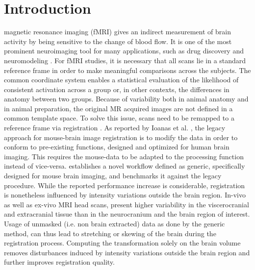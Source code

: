 \section{Introduction}
 magnetic resonance imaging (fMRI) gives an indirect measurement of brain activity by being sensitive to the change of blood flow.
It is one of the most prominent neuroimaging tool for many applications, such as drug discovery \cite{borsook_role_2006} and neuromodeling \cite{friston_dynamic_2003}.
For fMRI studies, it is necessary that all scans lie in a standard reference frame in order to make meaningful comparisons across the subjects.
The common coordinate system enables a statistical evaluation of the likelihood of consistent activation across a group or, in other contexts, the differences in anatomy between two groups.
Because of variability both in animal anatomy and in animal preparation, the original MR acquired images are not defined in a common template space.
To solve this issue, scans need to be remapped to a reference frame via registration \cite{maintz_overview_nodate, sotiras_deformable_2013}.
As reported by Ioanas et al. \cite{ioanas_optimized_2019}, the legacy approach for mouse-brain image registration is to modify the data in order to conform to pre-existing functions, designed and optimized for human brain imaging.
This requires the mouse-data to be adapted to the processing function instead of vice-versa.
\cite{ioanas_optimized_2019} establishes a novel workflow defined as generic, specifically designed for mouse brain imaging, and benchmarks it against the legacy procedure.
While the reported performance increase is considerable, registration is nonetheless influenced by intensity variations outside the brain region.
In-vivo as well as ex-vivo MRI head scans, present higher variability in the viscerocranial and extracranial tissue than in the neurocranium and the brain region of interest.
Usage of unmasked (i.e. non brain extracted) data as done by the generic method, can thus lead to stretching or skewing of the brain during the registration process.
Computing the transformation solely on the brain volume removes disturbances induced by intensity variations outside the brain region and further improves registration quality.

